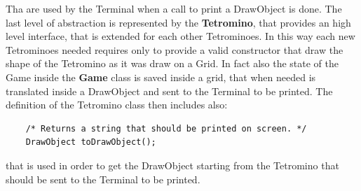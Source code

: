 \documentclass{article}
\begin{document}
Tha are used by the Terminal when a call to print a DrawObject is done.
The last level of abstraction is represented by the \textbf{Tetromino}, that provides an high level interface, that is extended for each other Tetrominoes. In this way each new Tetrominoes needed requires only to provide a valid constructor that draw the shape of the Tetromino as it was draw on a Grid.
In fact also the state of the Game inside the \textbf{Game} class is saved inside a grid, that when needed is translated inside a DrawObject and sent to the Terminal to be printed.
The definition of the Tetromino class then includes also:
\begin{verbatim}
    /* Returns a string that should be printed on screen. */
    DrawObject toDrawObject();
\end{verbatim}
that is used in order to get the DrawObject starting from the Tetromino that should be sent to the Terminal to be printed.
\end{document}
